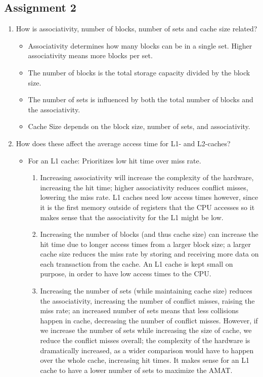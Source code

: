 \documentclass{article}
\begin{document}
\subsection{Assignment 2}
\begin{enumerate}
	\item How is associativity, number of blocks, number of sets and cache size related?
	\begin{itemize}
		\item Associativity determines how many blocks can be in a single set. Higher associativity means more blocks per set.
		\item The number of blocks is the total storage capacity divided by the block size.
		\item The number of sets is influenced by both the total number of blocks and the associativity.
		\item Cache Size depends on the block size, number of sets, and associativity.
	\end{itemize}
	\item How does these affect the average access time for L1- and L2-caches?
	\begin{itemize}
		\item For an L1 cache: Prioritizes low hit time over miss rate.
		\begin{enumerate}
			\item  Increasing associativity will increase the complexity of the hardware, increasing the hit time; higher associativity reduces conflict misses, lowering the miss rate. L1 caches need low access times however, since it is the first memory outside of registers that the CPU accesses so it makes sense that the associativity for the L1 might be low.
			\item Increasing the number of blocks (and thus cache size) can increase the hit time due to longer access times from a larger block size; a larger cache size reduces the miss rate by storing and receiving more data on each transaction from the cache. An L1 cache is kept small on purpose, in order to have low access times to the CPU.
			\item Increasing the number of sets (while maintaining cache size) reduces the associativity, increasing the number of conflict misses, raising the miss rate; an increased number of sets means that less collisions happen in cache, decreasing the number of conflict misses. However, if we increase the number of sets while increasing the size of cache, we reduce the conflict misses overall; the complexity of the hardware is dramatically increased, as a wider comparison would have to happen over the whole cache, increasing hit times. It makes sense for an L1 cache to have a lower number of sets to maximize the AMAT.  

\end{enumerate}
\end{itemize}
\end{enumerate}
\end{document}
